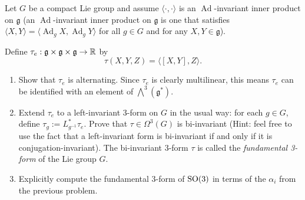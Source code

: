 \documentclass[12pt]{memoir}
\begin{document}
\begin{Ej}
    Let $G$ be a compact Lie group and assume $\langle \cdot , \cdot \rangle$ is an $\operatorname{Ad}$-invariant inner product on $\mathfrak{g}$ (an $\operatorname{Ad}$-invariant inner product on $\mathfrak{g}$ is one that satisfies $\langle X,Y \rangle = \langle \operatorname{Ad}_g X, \operatorname{Ad}_g Y \rangle$ for all $g \in G$ and for any $X,Y \in \mathfrak{g}$). 
	
	Define $\tau_e: \mathfrak{g} \times \mathfrak{g} \times \mathfrak{g} \to \mathbb{R}$ by
	\[
		\tau(X,Y,Z) = \langle [X,Y], Z\rangle.
	\]
	\begin{enumerate}
		\item Show that $\tau_e$ is alternating. Since $\tau_e$ is clearly multilinear, this means $\tau_e$ can be identified with an element of $\bigwedge^3(\mathfrak{g}^*)$.
		\item Extend $\tau_e$ to a left-invariant 3-form on $G$ in the usual way: for each $g \in G$, define $\tau_g := L_{g^{-1}}^* \tau_e$. Prove that $\tau \in \Omega^3(G)$ is bi-invariant (Hint: feel free to use the fact that a left-invariant form is bi-invariant if and only if it is conjugation-invariant). The bi-invariant 3-form $\tau$ is called the \emph{fundamental 3-form} of the Lie group $G$.
		\item Explicitly compute the fundamental 3-form of $\operatorname{SO}(3)$ in terms of the $\alpha_i$ from the previous problem. 
	\end{enumerate}
\end{Ej}

\begin{ptcbr}

\end{ptcbr}
\end{document}
